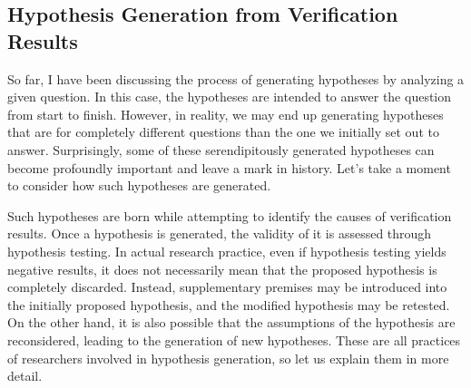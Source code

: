\documentclass{article}
\begin{document}


\subsection{Hypothesis Generation from Verification Results}
So far, I have been discussing the process of generating hypotheses by analyzing a given question. In this case, the hypotheses are intended to answer the question from start to finish. However, in reality, we may end up generating hypotheses that are for completely different questions than the one we initially set out to answer. Surprisingly, some of these serendipitously generated hypotheses can become profoundly important and leave a mark in history. Let's take a moment to consider how such hypotheses are generated.

Such hypotheses are born while attempting to identify the causes of verification results. Once a hypothesis is generated, the validity of it is assessed through hypothesis testing. In actual research practice, even if hypothesis testing yields negative results, it does not necessarily mean that the proposed hypothesis is completely discarded. Instead, supplementary premises may be introduced into the initially proposed hypothesis, and the modified hypothesis may be retested. On the other hand, it is also possible that the assumptions of the hypothesis are reconsidered, leading to the generation of new hypotheses. These are all practices of researchers involved in hypothesis generation, so let us explain them in more detail.
\end{document}
